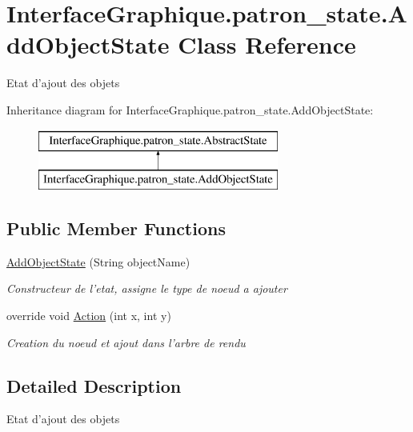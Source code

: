 \hypertarget{class_interface_graphique_1_1patron__state_1_1_add_object_state}{\section{Interface\-Graphique.\-patron\-\_\-state.\-Add\-Object\-State Class Reference}
\label{class_interface_graphique_1_1patron__state_1_1_add_object_state}
}


Etat d'ajout des objets  


Inheritance diagram for Interface\-Graphique.\-patron\-\_\-state.\-Add\-Object\-State\-:\begin{figure}[H]
\begin{center}
\leavevmode
\includegraphics[height=2.000000cm]{class_interface_graphique_1_1patron__state_1_1_add_object_state}
\end{center}
\end{figure}
\subsection*{Public Member Functions}
\begin{DoxyCompactItemize}
\item 
\hyperlink{class_interface_graphique_1_1patron__state_1_1_add_object_state_ad94cfea968dac4748bbd8161583bf71b}{Add\-Object\-State} (String object\-Name)
\begin{DoxyCompactList}\small\item\em Constructeur de l'etat, assigne le type de noeud a ajouter \end{DoxyCompactList}\item 
override void \hyperlink{class_interface_graphique_1_1patron__state_1_1_add_object_state_a5f251f4a42b766f424c3e31af3d181b3}{Action} (int x, int y)
\begin{DoxyCompactList}\small\item\em Creation du noeud et ajout dans l'arbre de rendu \end{DoxyCompactList}\end{DoxyCompactItemize}


\subsection{Detailed Description}
Etat d'ajout des objets 



